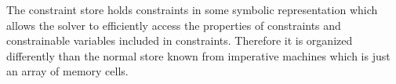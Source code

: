 The constraint store holds constraints in some symbolic representation
which allows the solver to efficiently access the properties of
constraints and constrainable variables included in constraints.
Therefore it is organized differently than the normal store known from
imperative machines which is just an array of memory cells.








